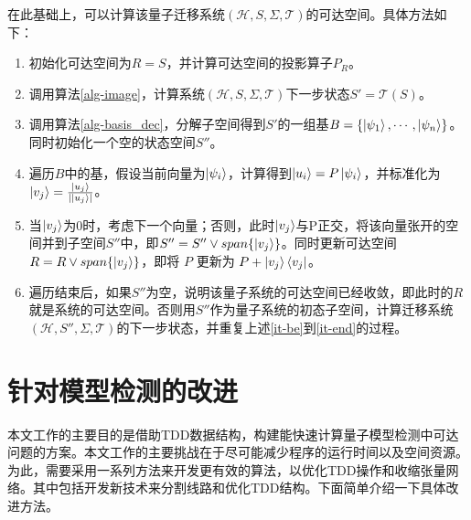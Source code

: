 在此基础上，可以计算该量子迁移系统$(\mathcal{H},S,\Sigma,\mathcal{T})$的可达空间。具体方法如下：
\begin{enumerate}
    \item 初始化可达空间为\(R = S\)，并计算可达空间的投影算子\(P_{R}\)。
    \item 调用算法\ref{alg-image}，计算系统$(\mathcal{H},S,\Sigma,\mathcal{T})$下一步状态\(S'=\mathcal{T}(S)\)。
    \item \label{it-be}调用算法\ref{alg-basis_dec}，分解子空间得到\(S'\)的一组基\(B = \{\ket{\psi_{1}},\cdots,\ket{\psi_{n}}\}\)。同时初始化一个空的状态空间$S''$。
    \item 遍历\(B\)中的基，假设当前向量为\(\ket{\psi_{i}}\)，计算得到\(\ket{u_i}=P\ket{\psi_{i}}\)，并标准化为$\ket{v_j}=\frac{\ket{u_j}}{|\ket{u_j}|}$。
    \item \label{it-end}当$\ket{v_j}$为0时，考虑下一个向量；否则，此时$\ket{v_j}$与P正交，将该向量张开的空间并到子空间$S''$中，即$S''=S''\vee span\{\ket{v_j}\}$。同时更新可达空间$R=R\vee span\{\ket{v_j}\}$，即将 $P$ 更新为 $P+\ket{v_j}\bra{v_j}$。
    \item 遍历结束后，如果$S''$为空，说明该量子系统的可达空间已经收敛，即此时的$R$就是系统的可达空间。否则用$S''$作为量子系统的初态子空间，计算迁移系统$(\mathcal{H},S'',\Sigma,\mathcal{T})$的下一步状态，并重复上述\ref{it-be}到\ref{it-end}的过程。
\end{enumerate}

\section{针对模型检测的改进}
\label{sec-optimize}
本文工作的主要目的是借助TDD数据结构，构建能快速计算量子模型检测中可达问题的方案。本文工作的主要挑战在于尽可能减少程序的运行时间以及空间资源。为此，需要采用一系列方法来开发更有效的算法，以优化TDD操作和收缩张量网络。其中包括开发新技术来分割线路和优化TDD结构。下面简单介绍一下具体改进方法。
